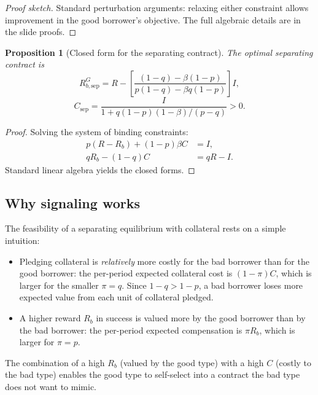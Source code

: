 \documentclass[11pt,a4paper,oneside]{book}
\theoremstyle{plain}
\newtheorem{proposition}[theorem]{Proposition}
\theoremstyle{definition}
\theoremstyle{remark}
\numberwithin{equation}{chapter}
\begin{document}
\begin{proof}[Proof sketch]
Standard perturbation arguments: relaxing either constraint allows improvement in the good borrower's objective.
The full algebraic details are in the slide proofs.
\end{proof}

\begin{proposition}[Closed form for the separating contract]\label{prop:diss-coll-closed-form}
The optimal separating contract is
\begin{equation}\label{eq:diss-coll-Rb-sep}
  R_{b, \text{sep}}^{G} = R - \left[ \frac{(1 - q) - \beta(1 - p)}{p(1 - q) - \beta q (1 - p)} \right] I,
\end{equation}
\begin{equation}\label{eq:diss-coll-C-sep}
  C_{\text{sep}} = \frac{I}{1 + q(1 - p)(1 - \beta)/(p - q)} > 0.
\end{equation}
\end{proposition}

\begin{proof}
Solving the system of binding constraints:
\begin{align*}
  p(R - R_b) + (1 - p) \beta C &= I, \\
  q R_b - (1 - q) C &= q R - I.
\end{align*}
Standard linear algebra yields the closed forms.
\end{proof}

\subsection{Why signaling works}

The feasibility of a separating equilibrium with collateral rests on a simple intuition:
\begin{itemize}
  \item Pledging collateral is \emph{relatively} more costly for the bad borrower than for the good borrower: the per-period expected collateral cost is $(1 - \pi) C$, which is larger for the smaller $\pi = q$.
  Since $1 - q > 1 - p$, a bad borrower loses more expected value from each unit of collateral pledged.
  \item A higher reward $R_b$ in success is valued more by the good borrower than by the bad borrower: the per-period expected compensation is $\pi R_b$, which is larger for $\pi = p$.
\end{itemize}
The combination of a high $R_b$ (valued by the good type) with a high $C$ (costly to the bad type) enables the good type to self-select into a contract the bad type does not want to mimic.
\end{document}
